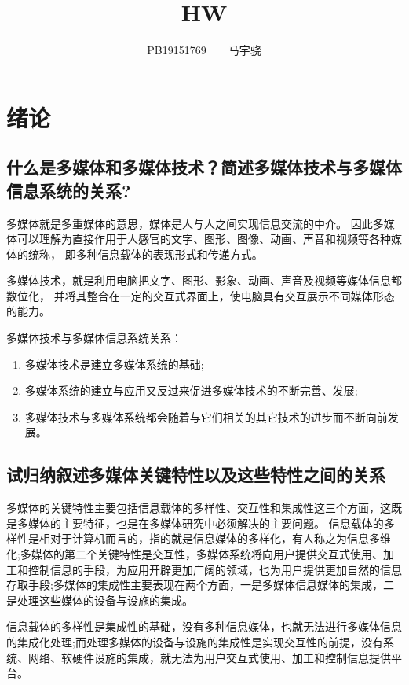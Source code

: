\documentclass[UTF8,a4paper,AutoFakeBold,AutoFakeSlant]{ctexart}
\title{\textbf{\textsf{{\textsf{HW} \heiti{多媒体技术基础}}}}}
\author{\ssong PB19151769~~~~马宇骁}
\date{}
\begin{document}
\maketitle

\tableofcontents
\newpage




\setcounter{section}{-1}
\section{绪论}


\subsection{什么是多媒体和多媒体技术？简述多媒体技术与多媒体信息系统的关系?}
多媒体就是多重媒体的意思，媒体是人与人之间实现信息交流的中介。
因此多媒体可以理解为直接作用于人感官的文字、图形、图像、动画、声音和视频等各种媒体的统称，
即多种信息载体的表现形式和传递方式。

多媒体技术，就是利用电脑把文字、图形、影象、动画、声音及视频等媒体信息都数位化，
并将其整合在一定的交互式界面上，使电脑具有交互展示不同媒体形态的能力。

多媒体技术与多媒体信息系统关系：
\begin{enumerate}
  \item 多媒体技术是建立多媒体系统的基础;
  \item 多媒体系统的建立与应用又反过来促进多媒体技术的不断完善、发展;
  \item 多媒体技术与多媒体系统都会随着与它们相关的其它技术的进步而不断向前发展。
\end{enumerate}



\subsection{试归纳叙述多媒体关键特性以及这些特性之间的关系}
多媒体的关键特性主要包括信息载体的多样性、交互性和集成性这三个方面，这既是多媒体的主要特征，也是在多媒体研究中必须解决的主要问题。
信息载体的多样性是相对于计算机而言的，指的就是信息媒体的多样化，有人称之为信息多维化;多媒体的第二个关键特性是交互性，多媒体系统将向用户提供交互式使用、加工和控制信息的手段，为应用开辟更加广阔的领域，也为用户提供更加自然的信息存取手段;多媒体的集成性主要表现在两个方面，一是多媒体信息媒体的集成，二是处理这些媒体的设备与设施的集成。

信息载体的多样性是集成性的基础，没有多种信息媒体，也就无法进行多媒体信息的集成化处理;而处理多媒体的设备与设施的集成性是实现交互性的前提，没有系统、网络、软硬件设施的集成，就无法为用户交互式使用、加工和控制信息提供平台。
\end{document}
